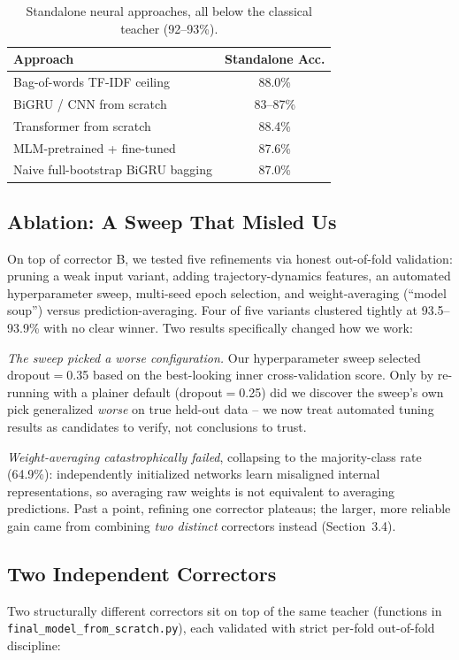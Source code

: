 \documentclass[10pt,twocolumn]{article}
\begin{document}
\begin{table}[!htb]
\centering\small
\begin{tabular}{@{}lc@{}}
\toprule
Approach & Standalone Acc. \\
\midrule
Bag-of-words TF-IDF ceiling & 88.0\% \\
BiGRU / CNN from scratch & 83--87\% \\
Transformer from scratch & 88.4\% \\
MLM-pretrained + fine-tuned & 87.6\% \\
Naive full-bootstrap BiGRU bagging & 87.0\% \\
\bottomrule
\end{tabular}
\caption{Standalone neural approaches, all below the classical teacher (92--93\%).}
\label{tab:failed}
\end{table}

\subsection{Ablation: A Sweep That Misled Us}
On top of corrector B, we tested five refinements via honest out-of-fold validation: pruning a weak input variant, adding trajectory-dynamics features, an automated hyperparameter sweep, multi-seed epoch selection, and weight-averaging (``model soup'') versus prediction-averaging. Four of five variants clustered tightly at 93.5--93.9\% with no clear winner. Two results specifically changed how we work:

\emph{The sweep picked a worse configuration.} Our hyperparameter sweep selected dropout$=$0.35 based on the best-looking inner cross-validation score. Only by re-running with a plainer default (dropout$=$0.25) did we discover the sweep's own pick generalized \emph{worse} on true held-out data -- we now treat automated tuning results as candidates to verify, not conclusions to trust.

\emph{Weight-averaging catastrophically failed}, collapsing to the majority-class rate (64.9\%): independently initialized networks learn misaligned internal representations, so averaging raw weights is not equivalent to averaging predictions. Past a point, refining one corrector plateaus; the larger, more reliable gain came from combining \emph{two distinct} correctors instead (Section~3.4).

\subsection{Two Independent Correctors}
Two structurally different correctors sit on top of the same teacher (functions in \texttt{final\_model\_from\_scratch.py}), each validated with strict per-fold out-of-fold discipline:
\end{document}
